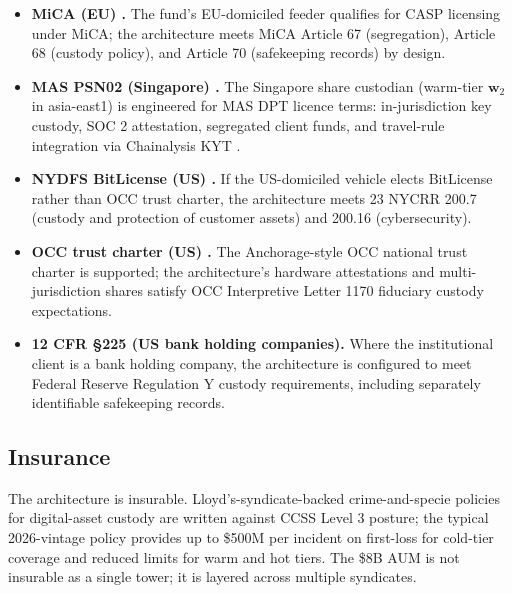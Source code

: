 \begin{itemize}[nosep]
\item \textbf{MiCA (EU) \cite{mica}.} The fund's EU-domiciled feeder
qualifies for CASP licensing under MiCA; the architecture meets MiCA
Article 67 (segregation), Article 68 (custody policy), and Article 70
(safekeeping records) by design.
\item \textbf{MAS PSN02 (Singapore) \cite{mas-psn02}.} The Singapore
share custodian (warm-tier $\mathbf{w}_2$ in asia-east1) is
engineered for MAS DPT licence terms: in-jurisdiction key custody,
SOC 2 attestation, segregated client funds, and travel-rule
integration via Chainalysis KYT \cite{chainalysis}.
\item \textbf{NYDFS BitLicense (US) \cite{nydfs-bitlicense}.} If the
US-domiciled vehicle elects BitLicense rather than OCC trust charter,
the architecture meets 23 NYCRR 200.7 (custody and protection of
customer assets) and 200.16 (cybersecurity).
\item \textbf{OCC trust charter (US) \cite{occ-trust}.} The
Anchorage-style OCC national trust charter is supported; the
architecture's hardware attestations and multi-jurisdiction
shares satisfy OCC Interpretive Letter 1170 fiduciary custody
expectations.
\item \textbf{12 CFR \S225 (US bank holding companies).} Where
the institutional client is a bank holding company, the architecture
is configured to meet Federal Reserve Regulation Y custody
requirements, including separately identifiable safekeeping records.
\end{itemize}

\subsection{Insurance}

The architecture is insurable. Lloyd's-syndicate-backed crime-and-specie
policies for digital-asset custody are written against CCSS Level 3
posture; the typical 2026-vintage policy provides up to \$500M per
incident on first-loss for cold-tier coverage and reduced limits for
warm and hot tiers. The \$8B AUM is not insurable as a single tower;
it is layered across multiple syndicates.

